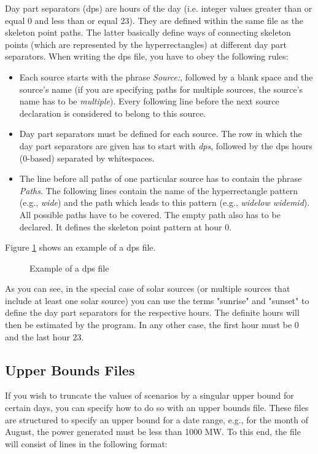 \documentclass[11pt]{article}
\begin{document}
Day part separators (dps) are hours of the day (i.e. integer values greater than or equal 0 and less than or equal 23). They are defined within the same file as the skeleton point paths. The latter basically define ways of connecting skeleton points (which are represented by the hyperrectangles) at different day part separators. When writing the dps file, you have to obey the following rules:
\begin{itemize}
	\item Each source starts with the phrase \textit{Source:}, followed by a blank space and the source's name (if you are specifying paths for multiple sources, the source's name has to be \textit{multiple}). Every following line before the next source declaration is considered to belong to this source.
	\item Day part separators must be defined for each source. The row in which the day part separators are given has to start with \textit{dps}, followed by the dps hours (0-based) separated by whitespaces.
	\item The line before all paths of one particular source has to contain the phrase \textit{Paths}. The following lines contain the name of the hyperrectangle pattern (e.g., \textit{wide}) and the path which leads to this pattern (e.g., \textit{widelow widemid}). All possible paths have to be covered. The empty path also has to be declared. It defines the skeleton point pattern at hour 0.
\end{itemize}
Figure \ref{fig:dps-file} shows an example of a dps file.

\begin{figure}[H]
	\begin{framed}
		
	\end{framed}
	\caption{Example of a dps file}
	\label{fig:dps-file}
\end{figure}

As you can see, in the special case of solar sources (or multiple sources that include at least one solar source) you can use the terms "sunrise" and "sunset" to define the day part separators for the respective hours. The definite hours will then be estimated by the program. In any other case, the first hour must be 0 and the last hour 23.


\subsection{Upper Bounds Files}
If you wish to truncate the values of scenarios by a singular upper bound for certain days, you can specify how to do so with an upper bounds file.
These files are structured to specify an upper bound for a date range, e.g., for the month of August, the power generated must be less than 1000 MW.
To this end, the file will consist of lines in the following format:
\end{document}
